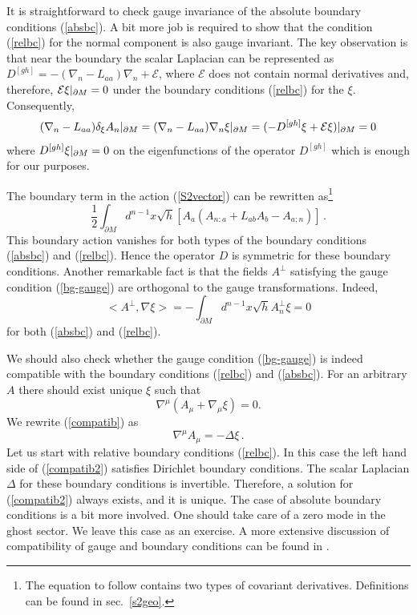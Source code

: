 It is straightforward
to check gauge invariance of the absolute boundary conditions
(\ref{absbc}). A bit more job is required to show that the
condition (\ref{relbc}) for the normal component is also gauge
invariant. The key observation is that near the boundary
the scalar Laplacian can be represented as
$D^{[gh]}=-(\nabla_n -L_{aa})\nabla_n +\mathcal{E}$,
where $\mathcal{E}$ does not contain normal derivatives
and, therefore, $\mathcal{E}\xi \vert_{\partial M} =0$ under the boundary
conditions (\ref{relbc}) for the $\xi$. Consequently,
\begin{equation}
(\nabla_n -L_{aa}) \delta_\xi A_n \vert_{\partial M} =
(\nabla_n -L_{aa})\nabla_n \xi \vert_{\partial M} =
(-D^{[gh]}\xi +\mathcal{E}\xi )\vert_{\partial M}=0 
\end{equation}
where $D^{[gh]}\xi \vert_{\partial M}=0$ on the eigenfunctions of the
operator $D^{[gh]}$ which is enough for our purposes.

The boundary term in the action (\ref{S2vector}) can be
rewritten as\footnote{The equation to follow contains two types
of covariant derivatives. Definitions can be found in sec.\ \ref{s2geo}.}
\begin{equation}
\frac 12 \int_{\partial M} d^{n-1}x \sqrt h 
[A_a(A_{n:a} +L_{ab}A_b -A_{a;n} )] \,.
\label{btvect}
\end{equation}
This boundary action vanishes for both types of
the boundary conditions (\ref{absbc}) and (\ref{relbc}).
Hence the operator $D$ is symmetric for these
boundary conditions. Another remarkable fact is that
the fields $A^\perp$ satisfying the gauge condition
(\ref{bg-gauge}) are orthogonal to the gauge transformations.
Indeed,
\begin{equation}
<A^\perp ,\nabla \xi > =-\int_{\partial M} d^{n-1}x \sqrt h
A^\perp_n \xi =0
\end{equation}
for both (\ref{absbc}) and (\ref{relbc}). 

We should also check whether the gauge condition (\ref{bg-gauge})
is indeed compatible with the boundary conditions (\ref{relbc})
and (\ref{absbc}). For an arbitrary $A$ there should exist
unique $\xi$ such that
\begin{equation}
\nabla^\mu (A_\mu + \nabla_\mu \xi )=0 .\label{compatib}
\end{equation}
We rewrite (\ref{compatib}) as
\begin{equation}
\nabla^\mu A_\mu =-\Delta \xi \,. \label{compatib2}
\end{equation}
Let us start with relative boundary conditions (\ref{relbc}).
In this case the left hand side of (\ref{compatib2}) satisfies
Dirichlet boundary conditions. The scalar Laplacian
$\Delta$ for these boundary conditions is invertible. 
Therefore, a solution for 
(\ref{compatib2}) always exists, and it is unique. The case of
absolute boundary conditions is a bit more involved.
One should take care of a zero mode in the ghost sector.
We leave this case as an exercise. A more extensive 
discussion of compatibility of gauge and boundary conditions
can be found in \cite{Vassilevich:1998iz}.

